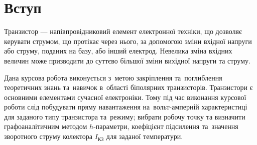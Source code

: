 \documentclass[ukrainian,utf8,nocolumnsxix,nocolumnxxxi,nocolumnxxxii]{eskdtext}
\let\stdsection\section
\renewcommand\section{\newpage\stdsection}
\begin{document}

			
			
	
	\maketitle

	\newpage
	
	\section*{Вступ}
		Транзистор --- напівпровідниковий елемент електронної техніки, що дозволяє керувати струмом, що протікає через нього, за допомогою зміни вхідної напруги або струму, поданих на базу, або інший електрод. Невелика зміна вхідних величин може призводити до суттєво більшої зміни вихідної напруги та струму.
		
		Дана курсова робота виконується з~метою закріплення та~поглиблення теоретичних знань та~навичок в~області біполярних транзисторів. Транзистори є основними елементами сучасної електроніки. Тому під час виконання курсової роботи слід побудувати пряму навантаження на~вольт-амперній характеристиці для заданого типу транзистора та~режиму; вибрати робочу точку та визначити графоаналітичним методом $h$-параметри, коефіцієнт підсилення та~значення зворотного струму колектора $I_{\text{КЗ}}$ для заданої температури.
	
\end{document}
